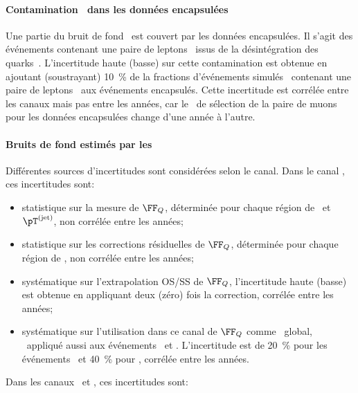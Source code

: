 \paragraph{Contamination \ttbar\ dans les données encapsulées}
Une partie du bruit de fond \ttbar\ est couvert par les données encapsulées.
Il s'agit des événements contenant une paire de leptons \tau\ issus de la désintégration des quarks~\quarkt.
L'incertitude haute (basse) sur cette contamination est obtenue en ajoutant (soustrayant) \SI{10}{\%} de la fractions d'événements simulés \ttbar\ contenant une paire de leptons \tau\ aux événements encapsulés.
Cette incertitude est corrélée entre les canaux mais pas entre les années, car le \HLTpath\ de sélection de la paire de muons pour les données encapsulées change d'une année à l'autre.
\paragraph{Bruits de fond estimés par les \fakefactors}
Différentes sources d'incertitudes sont considérées selon le canal.
Dans le canal \tauh\tauh, ces incertitudes sont:
\begin{itemize}
\item statistique sur la mesure de $\FF_Q$, déterminée pour chaque région de \Njets\ et $\pT^{(\text{jet})}$, non corrélée entre les années;
\item statistique sur les corrections résiduelles de $\FF_Q$, déterminée pour chaque région de \Njets, non corrélée entre les années;
\item systématique sur l'extrapolation OS/SS de $\FF_Q$, l'incertitude haute (basse) est obtenue en appliquant deux (zéro) fois la correction, corrélée entre les années;
\item systématique sur l'utilisation dans ce canal de $\FF_Q$ comme \FF\ global, \ie\ appliqué aussi aux événements \Wjets\ et \ttbar. L'incertitude est de \SI{20}{\%} pour les événements \Wjets\ et \SI{40}{\%} pour \ttbar, corrélée entre les années.
\end{itemize}
Dans les canaux \mu\tauh\ et \ele\tauh, ces incertitudes sont:
